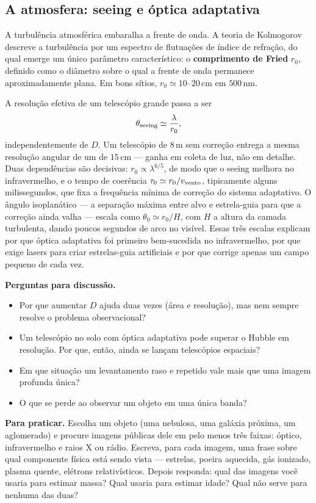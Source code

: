 \documentclass[11pt,a4paper]{article}
\begin{document}
\subsection*{A atmosfera: seeing e óptica adaptativa}

A turbulência atmosférica embaralha a frente de onda. A teoria de Kolmogorov descreve a turbulência por um espectro de flutuações de índice de refração, do qual emerge um único parâmetro característico: o \textbf{comprimento de Fried} $r_0$, definido como o diâmetro sobre o qual a frente de onda permanece aproximadamente plana. Em bons sítios, $r_0\simeq10$--$20\,\mathrm{cm}$ em $500\,\mathrm{nm}$.

A resolução efetiva de um telescópio grande passa a ser
\[
\theta_{\rm seeing}\simeq\frac{\lambda}{r_0},
\]
independentemente de $D$. Um telescópio de $8\,\mathrm{m}$ sem correção entrega a mesma resolução angular de um de $15\,\mathrm{cm}$ --- ganha em coleta de luz, não em detalhe. Duas dependências são decisivas: $r_0\propto\lambda^{6/5}$, de modo que o seeing melhora no infravermelho, e o tempo de coerência $\tau_0\simeq r_0/v_{\rm vento}$, tipicamente alguns milissegundos, que fixa a frequência mínima de correção do sistema adaptativo. O ângulo isoplanático --- a separação máxima entre alvo e estrela-guia para que a correção ainda valha --- escala como $\theta_0\simeq r_0/H$, com $H$ a altura da camada turbulenta, dando poucos segundos de arco no visível. Essas três escalas explicam por que óptica adaptativa foi primeiro bem-sucedida no infravermelho, por que exige lasers para criar estrelas-guia artificiais e por que corrige apenas um campo pequeno de cada vez.


\textbf{Perguntas para discussão.}
\begin{itemize}
\item Por que aumentar $D$ ajuda duas vezes (área e resolução), mas nem sempre resolve o problema observacional?
\item Um telescópio no solo com óptica adaptativa pode superar o Hubble em resolução. Por que, então, ainda se lançam telescópios espaciais?
\item Em que situação um levantamento raso e repetido vale mais que uma imagem profunda única?
\item O que se perde ao observar um objeto em uma única banda?
\end{itemize}

\textbf{Para praticar.} Escolha um objeto (uma nebulosa, uma galáxia próxima, um aglomerado) e procure imagens públicas dele em pelo menos três faixas: óptico, infravermelho e raios X ou rádio. Escreva, para cada imagem, uma frase sobre qual componente física está sendo vista --- estrelas, poeira aquecida, gás ionizado, plasma quente, elétrons relativísticos. Depois responda: qual das imagens você usaria para estimar massa? Qual usaria para estimar idade? Qual não serve para nenhuma das duas?
\end{document}
